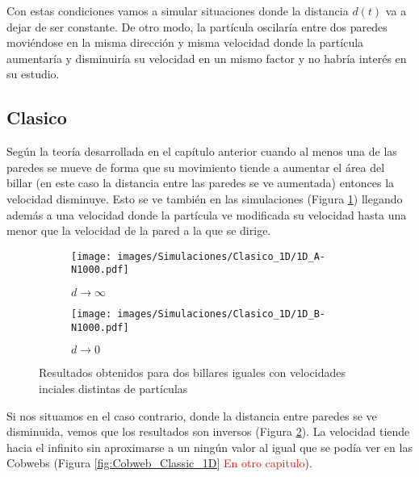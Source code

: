 \documentclass[11pt, spanish]{book}
\begin{document}
\vspace{3mm}

Con estas condiciones vamos a simular situaciones donde la distancia \( d(t) \) va a dejar de ser constante. De otro modo, la partícula oscilaría entre dos paredes moviéndose en la misma dirección y misma velocidad donde la partícula aumentaría y disminuiría su velocidad en un mismo factor y no habría interés en su estudio.

\subsection{Clasico}

Según la teoría desarrollada en el capítulo anterior cuando al menos una de las paredes se mueve de forma que su movimiento tiende a aumentar el área del billar (en este caso la distancia entre las paredes se ve aumentada) entonces la velocidad disminuye. Esto se ve también en las simulaciones (Figura \ref{fig:clasico_1D_A}) llegando además a una velocidad donde la partícula ve modificada su velocidad hasta una menor que la velocidad de la pared a la que se dirige.

\begin{figure}[!h]
    \begin{subfigure}[b]{0.5\textwidth}
        \centering
        \texttt{[image: images/Simulaciones/Clasico\_1D/1D\_A-N1000.pdf]}
        \caption{\( d \rightarrow \infty \)}
        \label{fig:clasico_1D_A}
    \end{subfigure}
    \hfill
    \begin{subfigure}[b]{0.5\textwidth}
        \centering
        \texttt{[image: images/Simulaciones/Clasico\_1D/1D\_B-N1000.pdf]}
        \caption{\( d \rightarrow 0 \)}
        \label{fig:clasico_1D_B}
    \end{subfigure}
    \caption{Resultados obtenidos para dos billares iguales con velocidades inciales distintas de partículas}
    \label{fig:clasico_1D}
\end{figure}

Si nos situamos en el caso contrario, donde la distancia entre paredes se ve disminuida, vemos que los resultados son inversos (Figura \ref{fig:clasico_1D_B}). La velocidad tiende hacia el infinito sin aproximarse a un ningún valor al igual que se podía ver en las Cobwebs (Figura \ref{fig:Cobweb_Classic_1D} \textcolor{red}{En otro capitulo}). 

\vspace{3mm}
\end{document}
